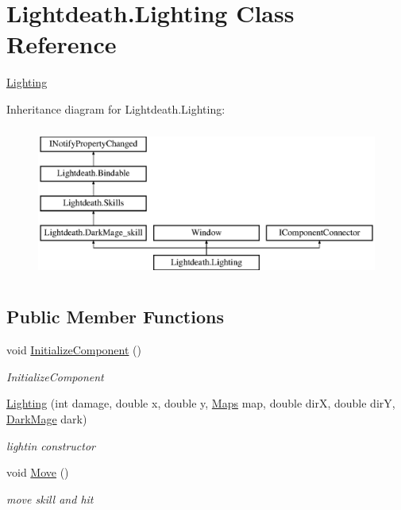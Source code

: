 \hypertarget{class_lightdeath_1_1_lighting}{}\section{Lightdeath.\+Lighting Class Reference}
\label{class_lightdeath_1_1_lighting}


\hyperlink{class_lightdeath_1_1_lighting}{Lighting}  


Inheritance diagram for Lightdeath.\+Lighting\+:\begin{figure}[H]
\begin{center}
\leavevmode
\includegraphics[height=5.000000cm]{class_lightdeath_1_1_lighting}
\end{center}
\end{figure}
\subsection*{Public Member Functions}
\begin{DoxyCompactItemize}
\item 
void \hyperlink{class_lightdeath_1_1_lighting_a59c50e40df4a96ac572253c5323e4b44}{Initialize\+Component} ()
\begin{DoxyCompactList}\small\item\em Initialize\+Component \end{DoxyCompactList}\item 
\hyperlink{class_lightdeath_1_1_lighting_a8993a66b1189dc7783ebbaeb24fbf96b}{Lighting} (int damage, double x, double y, \hyperlink{class_lightdeath_1_1_maps}{Maps} map, double dirX, double dirY, \hyperlink{class_lightdeath_1_1_dark_mage}{Dark\+Mage} dark)
\begin{DoxyCompactList}\small\item\em lightin constructor \end{DoxyCompactList}\item 
void \hyperlink{class_lightdeath_1_1_lighting_ad8f10c0b173b0cd317d3566ea901991c}{Move} ()
\begin{DoxyCompactList}\small\item\em move skill and hit \end{DoxyCompactList}\end{DoxyCompactItemize}
